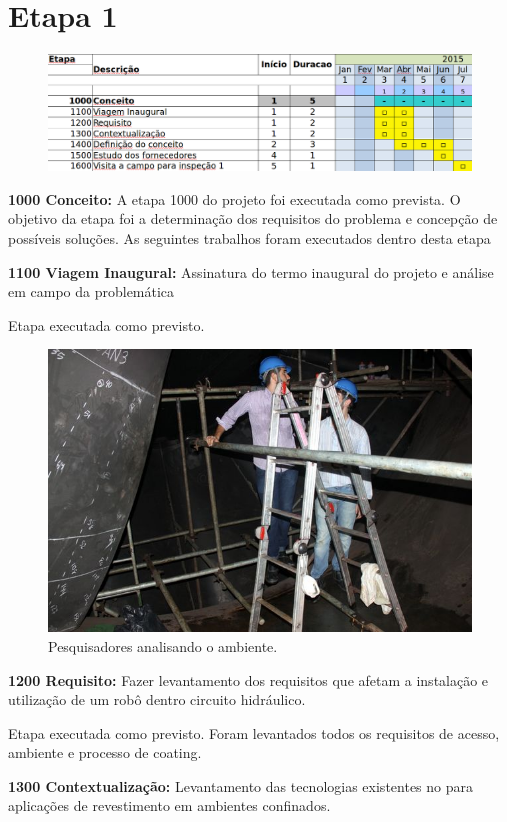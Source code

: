 

\section{Etapa 1}

\begin{figure}[H]
\centering
\includegraphics[width=0.9\columnwidth]{figs/etapa1}
\end{figure} 

\textbf{1000 Conceito:} A etapa 1000 do projeto foi executada como prevista. O
objetivo da etapa foi a determinação dos requisitos do problema e concepção de
possíveis soluções. As seguintes trabalhos foram executados dentro desta etapa

\textbf{1100 Viagem Inaugural:} Assinatura do termo inaugural do projeto e
análise em campo da problemática

Etapa executada como previsto. 

\begin{figure}
\centering
\includegraphics[width=0.6\columnwidth]{figs/img_4967}
\caption{Pesquisadores analisando o ambiente.}
\end{figure}


\textbf{1200 Requisito:} Fazer levantamento dos requisitos que afetam a
instalação e utilização de um robô dentro circuito hidráulico.

Etapa executada como previsto. Foram levantados todos os requisitos de acesso,
ambiente e processo de coating.

\textbf{1300 Contextualização:} Levantamento das tecnologias existentes no para
aplicações de revestimento em ambientes confinados.

